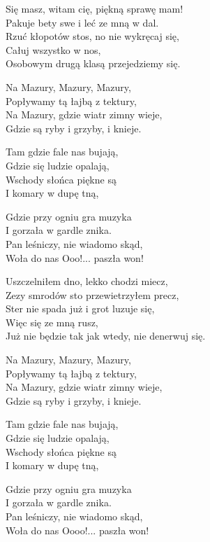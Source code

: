 \begin{text}
    Się masz, witam cię, piękną sprawę mam!\\
    Pakuje bety swe i leć ze mną w dal.\\
    Rzuć kłopotów stos, no nie wykręcaj się,\\
    Całuj wszystko w nos,\\
    Osobowym drugą klasą przejedziemy się.

    \vin Na Mazury, Mazury, Mazury,\\
    \vin Popływamy tą łajbą z tektury,\\
    \vin Na Mazury, gdzie wiatr zimny wieje,\\
    \vin Gdzie są ryby i grzyby, i knieje.

    \vin Tam gdzie fale nas bujają,\\
    \vin Gdzie się ludzie opalają,\\
    \vin Wschody słońca piękne są\\
    \vin I komary w dupę tną,

    \vin Gdzie przy ogniu gra muzyka\\
    \vin I gorzała w gardle znika.\\
    \vin Pan leśniczy, nie wiadomo skąd,\\
    \vin Woła do nas Ooo!... paszła won!

    Uszczelniłem dno, lekko chodzi miecz,\\
    Zezy smrodów sto przewietrzyłem precz,\\
    Ster nie spada już i grot luzuje się,\\
    Więc się ze mną rusz,\\
    Już nie będzie tak jak wtedy, nie denerwuj się.

    \vin Na Mazury, Mazury, Mazury,\\
    \vin Popływamy tą łajbą z tektury,\\
    \vin Na Mazury, gdzie wiatr zimny wieje,\\
    \vin Gdzie są ryby i grzyby, i knieje.

    \vin Tam gdzie fale nas bujają,\\
    \vin Gdzie się ludzie opalają,\\
    \vin Wschody słońca piękne są\\
    \vin I komary w dupę tną,

    \vin Gdzie przy ogniu gra muzyka\\
    \vin I gorzała w gardle znika.\\
    \vin Pan leśniczy, nie wiadomo skąd,\\
    \vin Woła do nas Oooo!... paszła won!


\end{text}
